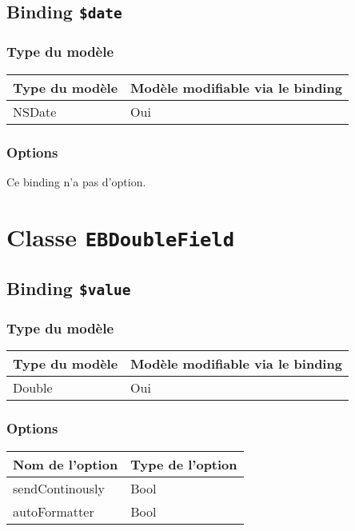 \subsection{Binding \texttt{\$date}}

\subsubsection{Type du modèle}

\begin{tabular}{|l|l|}
\hline
\textbf{Type du modèle} & \textbf{Modèle modifiable via le binding}\\
\hline
NSDate & Oui\\
\hline
\end{tabular}
\subsubsection{Options}

Ce binding n'a pas d'option.








\section{Classe \texttt{EBDoubleField}}

\subsection{Binding \texttt{\$value}}

\subsubsection{Type du modèle}

\begin{tabular}{|l|l|}
\hline
\textbf{Type du modèle} & \textbf{Modèle modifiable via le binding}\\
\hline
Double & Oui\\
\hline
\end{tabular}
\subsubsection{Options}

\begin{tabular}{|l|l|}
\hline
\textbf{Nom de l'option} & \textbf{Type de l'option}\\
\hline
sendContinously & Bool\\
\hline
autoFormatter & Bool\\
\hline
\end{tabular}







